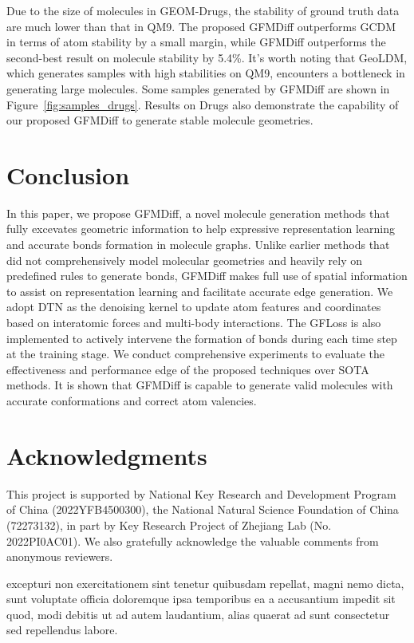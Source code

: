 \documentclass[letterpaper]{article} %
\begin{document}
Due to the size of molecules in GEOM-Drugs, the stability of ground truth data are much lower than that in QM9. The proposed GFMDiff outperforms GCDM in terms of atom stability by a small margin, while GFMDiff outperforms the second-best result on molecule stability by 5.4\%. It's worth noting that GeoLDM, which generates samples with high stabilities on QM9, encounters a bottleneck in generating large molecules. Some samples generated by GFMDiff are shown in Figure~\ref{fig:samples_drugs}. Results on Drugs also demonstrate the capability of our proposed GFMDiff to generate stable molecule geometries.

\vspace{-0.95mm}
\vspace{-1.61mm}
\section{Conclusion}
In this paper, we propose GFMDiff, a novel molecule generation methods that fully excevates geometric information to help expressive representation learning and accurate bonds formation in molecule graphs. Unlike earlier methods that did not comprehensively model molecular geometries and heavily rely on predefined rules to generate bonds, GFMDiff makes full use of spatial information to assist on representation learning and facilitate accurate edge generation. We adopt DTN as the denoising kernel to update atom features and coordinates based on interatomic forces and multi-body interactions. The GFLoss is also implemented to actively intervene the formation of bonds during each time step at the training stage. We conduct comprehensive experiments to evaluate the effectiveness and performance edge of the proposed techniques over SOTA methods. It is shown that GFMDiff is capable to generate valid molecules with accurate conformations and correct atom valencies.


\vspace{-0.91mm}
\vspace{-1.79mm}
\section{Acknowledgments}
This project is supported by National Key Research and Development Program of China (2022YFB4500300), the National Natural Science Foundation of China (72273132), in part by Key Research Project of Zhejiang Lab (No. 2022PI0AC01). We also gratefully acknowledge the valuable comments from anonymous reviewers.


excepturi non exercitationem sint tenetur quibusdam repellat, magni nemo dicta, sunt voluptate officia doloremque ipsa temporibus ea a accusantium impedit sit quod, modi debitis ut ad autem laudantium, alias quaerat ad sunt consectetur sed repellendus labore.\clearpage

\end{document}
